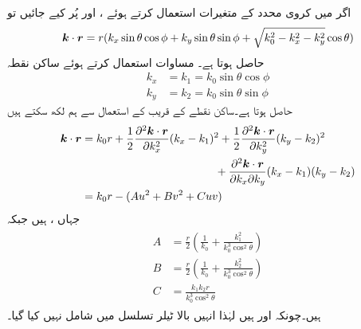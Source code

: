 اگر  میں کروی محدد کے متغیرات استعمال کرتے ہوئے ،  اور  پُر کیے جائیں تو
\begin{align}
{\ensuremath{{\boldsymbol{k}}}}\cdot{\ensuremath{{\boldsymbol{r}}}}=r(k_x \sin\theta\cos\phi+k_y\sin\theta\sin\phi+\sqrt{k_0^2-k_x^2-k_y^2}\cos \theta)
\end{align}
حاصل ہوتا ہے۔ مساوات  استعمال کرتے ہوئے ساکن نقطہ
\begin{align}
k_x&=k_1=k_0 \sin\theta\cos\phi\\
k_y&=k_2=k_0\sin\theta\sin\phi
\end{align}
حاصل ہوتا ہے۔ساکن نقطے کے قریب  کے استعمال سے ہم لکھ سکتے ہیں
\begin{align*}
{\ensuremath{{\boldsymbol{k}}}}\cdot{\ensuremath{{\boldsymbol{r}}}}&=k_0 r +\frac{1}{2}\frac{\partial^2 {{\boldsymbol{k}}}\cdot{\ensuremath{{\boldsymbol{r}}}}  }{\partial k_x^2} (k_x-k_1)^2+\frac{1}{2}\frac{\partial^2 {{\boldsymbol{k}}}\cdot{\ensuremath{{\boldsymbol{r}}}}  }{\partial k_y^2} (k_y-k_2)^2 \\
& \quad \quad\quad \quad\quad \quad\quad \quad\quad \quad\quad \quad +\frac{\partial^2 {{\boldsymbol{k}}}\cdot{\ensuremath{{\boldsymbol{r}}}}  }{\partial k_x \partial k_y} (k_x-k_1)(k_y-k_2)\\
&=k_0 r-(A u^2+B v^2+C u v)
\end{align*}
جہاں ،  ہیں جبکہ
\begin{gather}
\begin{aligned}\label{مساوات_اینٹینا_ساکن_نقطہ_مستقل}
A&=\frac{r}{2}\left(\frac{1}{k_0}+\frac{k_1^2}{k_0^3 \cos^2 \theta}\right)\\
B&=\frac{r}{2}\left(\frac{1}{k_0}+\frac{k_2^2}{k_0^3 \cos^2 \theta}\right)\\
C&=\frac{k_1 k_2 r}{k_0^3 \cos^2 \theta}
\end{aligned}
\end{gather}
ہیں۔چونکہ  اور  ہیں لہٰذا  انہیں بالا ٹیلر تسلسل میں شامل نہیں کیا گیا۔

